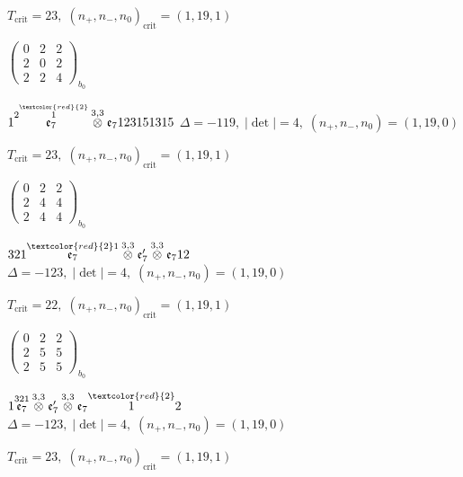\documentclass[10pt]{article}
\begin{document}
\hspace{1em}$T_{\text{crit}}=23,\; (n_+,n_-,n_0)_{\text{crit}}=(1,19,1)$

\hspace{2em}$\left(\begin{smallmatrix}0 & 2 & 2 \\ 2 & 0 & 2 \\ 2 & 2 & 4\end{smallmatrix}\right)_{\!b_0}$

\smallskip

$1\overset{2\overset{\textcolor{red}{2}}{1}}{\mathfrak{e}_7}\overset{3,3}{\otimes}\mathfrak{e}_7123151315$ \quad $\Delta=-119,\; |\det|=4,\; (n_+,n_-,n_0)=(1,19,0)$

\hspace{1em}$T_{\text{crit}}=23,\; (n_+,n_-,n_0)_{\text{crit}}=(1,19,1)$

\hspace{2em}$\left(\begin{smallmatrix}0 & 2 & 2 \\ 2 & 4 & 4 \\ 2 & 4 & 4\end{smallmatrix}\right)_{\!b_0}$

\smallskip

$321\overset{\textcolor{red}{2}1}{\mathfrak{e}_7}\overset{3,3}{\otimes}\mathfrak{e}_7'\overset{3,3}{\otimes}\mathfrak{e}_712$ \quad $\Delta=-123,\; |\det|=4,\; (n_+,n_-,n_0)=(1,19,0)$

\hspace{1em}$T_{\text{crit}}=22,\; (n_+,n_-,n_0)_{\text{crit}}=(1,19,1)$

\hspace{2em}$\left(\begin{smallmatrix}0 & 2 & 2 \\ 2 & 5 & 5 \\ 2 & 5 & 5\end{smallmatrix}\right)_{\!b_0}$

$1\overset{321}{\mathfrak{e}_7}\overset{3,3}{\otimes}\mathfrak{e}_7'\overset{3,3}{\otimes}\mathfrak{e}_7\overset{\textcolor{red}{2}}{1}2$ \quad $\Delta=-123,\; |\det|=4,\; (n_+,n_-,n_0)=(1,19,0)$

\hspace{1em}$T_{\text{crit}}=23,\; (n_+,n_-,n_0)_{\text{crit}}=(1,19,1)$
\end{document}
